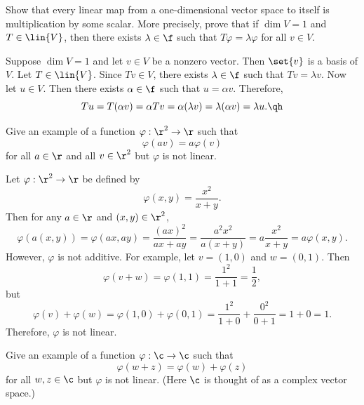 \begin{exercise}[3a7]
    Show that every linear map from a one-dimensional vector space to itself is multiplication by some scalar. More precisely, prove that if $\dim V = 1$ and $T \in \lin{V}$, then there exists $\lambda \in \f$ such that $T\varphi = \lambda\varphi$ for all $v \in V$.
\end{exercise}

\begin{sol}
    Suppose $\dim V = 1$ and let $v \in V$ be a nonzero vector. Then $\set{v}$ is a basis of $V$. Let $T \in \lin{V}$. Since $Tv \in V$, there exists $\lambda \in \f$ such that $Tv = \lambda v$. Now let $u \in V$. Then there exists $\alpha \in \f$ such that $u = \alpha v$. Therefore,
    \[Tu = T(\alpha v) = \alpha Tv = \alpha (\lambda v) = \lambda (\alpha v) = \lambda u. \qh\]
\end{sol}

\begin{exercise}[3a8]
    Give an example of a function $\varphi: \r^2 \to \r$ such that
    \[\varphi(av) = a\varphi(v)\]
    for all $a \in \r$ and all $v \in \r^2$ but $\varphi$ is not linear.

\end{exercise}

\begin{sol}
    Let $\varphi: \r^2 \to \r$ be defined by
    \[\varphi(x, y) = \frac{x^2}{x + y}.\]
    Then for any $a \in \r$ and $(x, y) \in \r^2$,
    \[\varphi(a(x, y)) = \varphi(ax, ay) = \frac{(ax)^2}{ax + ay} = \frac{a^2 x^2}{a(x + y)} = a\frac{x^2}{x + y} = a\varphi(x, y).\]
    However, $\varphi$ is not additive. For example, let $v = (1, 0)$ and $w = (0, 1)$. Then
    \[\varphi(v + w) = \varphi(1, 1) = \frac{1^2}{1 + 1} = \frac{1}{2},\]
    but
    \[\varphi(v) + \varphi(w) = \varphi(1, 0) + \varphi(0, 1) = \frac{1^2}{1 + 0} + \frac{0^2}{0 + 1} = 1 + 0 = 1.\]
    Therefore, $\varphi$ is not linear.
\end{sol}

\begin{exercise}[3a9]
    Give an example of a function $\varphi: \c \to \c$ such that
    \[\varphi(w + z) = \varphi(w) + \varphi(z)\]
    for all $w, z \in \c$ but $\varphi$ is not linear. (Here $\c$ is thought of as a complex vector space.)
\end{exercise}

